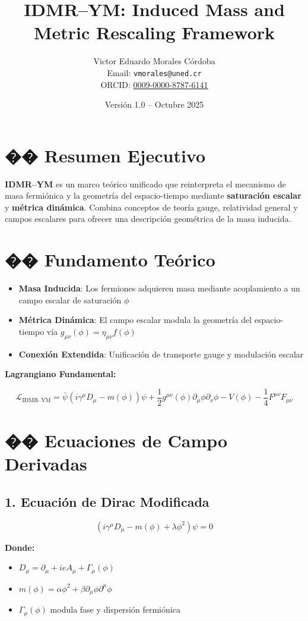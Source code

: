 \documentclass[12pt]{article}
\title{IDMR--YM: Induced Mass and Metric Rescaling Framework}
\author{
Victor Eduardo Morales Córdoba \\
Email: \texttt{vmorales@uned.cr} \\
ORCID: \href{https://orcid.org/0009-0000-8787-6141}{0009-0000-8787-6141}
}
\date{Versión 1.0 -- Octubre 2025}
\begin{document}
\maketitle

\section*{�� Resumen Ejecutivo}
\textbf{IDMR--YM} es un marco teórico unificado que reinterpreta el mecanismo de masa fermiónica y la geometría del espacio-tiempo mediante \textbf{saturación escalar} y \textbf{métrica dinámica}. Combina conceptos de teoría gauge, relatividad general y campos escalares para ofrecer una descripción geométrica de la masa inducida.

\section*{�� Fundamento Teórico}
\begin{itemize}
  \item \textbf{Masa Inducida}: Los fermiones adquieren masa mediante acoplamiento a un campo escalar de saturación \( \phi \)
  \item \textbf{Métrica Dinámica}: El campo escalar modula la geometría del espacio-tiempo vía \( g_{\mu\nu}(\phi) = \eta_{\mu\nu} f(\phi) \)
  \item \textbf{Conexión Extendida}: Unificación de transporte gauge y modulación escalar
\end{itemize}

\textbf{Lagrangiano Fundamental:}


\[
\mathcal{L}_{\text{IDMR--YM}} = \bar{\psi}(i\gamma^\mu D_\mu - m(\phi))\psi + \frac{1}{2}g^{\mu\nu}(\phi)\partial_\mu \phi \partial_\nu \phi - V(\phi) - \frac{1}{4}F^{\mu\nu}F_{\mu\nu}
\]



\section*{�� Ecuaciones de Campo Derivadas}
\subsection*{1. Ecuación de Dirac Modificada}


\[
(i\gamma^\mu D_\mu - m(\phi) + \lambda\phi^2)\psi = 0
\]


\textbf{Donde:}
\begin{itemize}
  \item \( D_\mu = \partial_\mu + ieA_\mu + \Gamma_\mu(\phi) \)
  \item \( m(\phi) = \alpha\phi^2 + \beta\partial_\mu\phi\partial^\mu\phi \)
  \item \( \Gamma_\mu(\phi) \) modula fase y dispersión fermiónica
\end{itemize}
\end{document}
